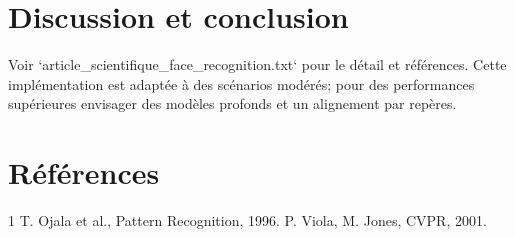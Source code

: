 \documentclass[conference]{IEEEtran}
\begin{document}
\section{Discussion et conclusion}
Voir `article_scientifique_face_recognition.txt` pour le détail et références. Cette implémentation est adaptée à des scénarios modérés; pour des performances supérieures envisager des modèles profonds et un alignement par repères.
\section*{Références}
\begin{thebibliography}{1}
 T. Ojala et al., Pattern Recognition, 1996.
 P. Viola, M. Jones, CVPR, 2001.
\end{thebibliography}
\end{document}
